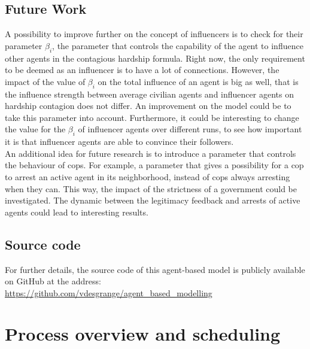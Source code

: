 \documentclass[10pt]{article}
\begin{document}
    \subsection{Future Work}
    A possibility to improve further on the concept of influencers is to check for their parameter $\beta_i$, the parameter that controls the capability of the agent to influence other agents in the contagious hardship formula. Right now, the only requirement to be deemed as an influencer is to have a lot of connections. However, the impact of the value of $\beta_i$ on the total influence of an agent is big as well, that is the influence strength between average civilian agents and influencer agents  on hardship contagion does not differ. An improvement on the model could be to take this parameter into account. Furthermore, it could be interesting to change the value for the $\beta_i$ of influencer agents over different runs, to see how important it is that influencer agents are able to convince their followers.\\

    An additional idea for future research is to introduce a parameter that controls the behaviour of cops. For example, a parameter that gives a possibility for a cop to arrest an active agent in its neighborhood, instead of cops always arresting when they can. This way, the impact of the strictness of a government could be investigated. The dynamic between the legitimacy feedback and arrests of active agents could lead to interesting results.

    \subsection{Source code}

    For further details, the source code of this agent-based model is publicly available on GitHub at the address: \url{https://github.com/vdesgrange/agent_based_modelling}

    

    \newpage

    \appendix
    \section{Process overview and scheduling}
    \vspace*{0pt}
    \label{appendix:A}
\end{document}
